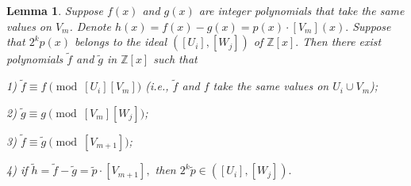 \documentclass[10pt]{article}
\newtheorem{lemma}[theorem]{Lemma}
\theoremstyle{definition}
\begin{document}
\begin{lemma} Suppose $f(x)$ and $g(x)$ are integer polynomials that take the same values on $V_m$. Denote $h(x)=f(x)-g(x) = p(x) \cdot [V_m](x). $ Suppose that $2^kp(x)$ belongs to the ideal $([U_i],[W_j])$ of $\mathbb Z [x].$ Then there exist polynomials $\tilde{f}$ and $\tilde{g}$  in $\mathbb Z[x]$ such that

1) $\tilde{f} \equiv f \pmod {[U_{i}][V_m]}$ (i.e., $\tilde{f}$ and $f$ take the same values on $U_i \cup V_m$);

2) $\tilde{g} \equiv g \pmod {[V_m][W_{j}]}$;

3) $\tilde{f} \equiv \tilde{g} \pmod {[V_{m+1}]}$;

4) if $\tilde{h}=  \tilde{f}- \tilde{g} =\tilde{p}\cdot [V_{m+1}],$ then $2^k\tilde{p}\in ([U_i],[W_j]).$  
\end{lemma}
\end{document}
